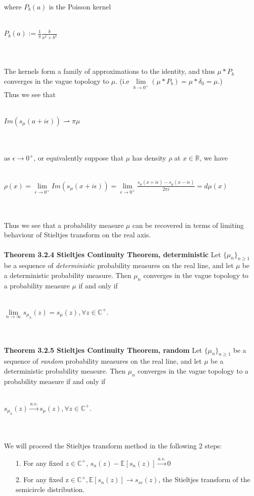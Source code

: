 \documentclass{article}
\begin{document}
where $P_b(a)$ is the Poisson kernel \\
\\
\centerline{$P_b(a) := \frac{1}{\pi} \frac{b}{x^2 + b^2}$}
\\
\\
The kernels form a family of approximations to the identity, and thus $\mu * P_b$ converges in the vague topology to $\mu$. (i.e $\lim\limits_{b \rightarrow 0^+} (\mu * P_b) = \mu * \delta_0 = \mu$.)\\
Thus we see that \\
\\
\centerline{$Im(s_\mu (a + i\epsilon)) \rightharpoonup \pi \mu$}
\\
\\
as $\epsilon \rightarrow 0^+$, or equivalently suppose that $\mu$ has density $\rho$ at $x \in \mathbb{R}$, we have \\
\\
\centerline{$\rho (x) = \lim\limits_{\epsilon \rightarrow 0^+} Im(s_\mu (x + i \epsilon)) = \lim\limits_{\epsilon \rightarrow 0^+} \frac{s_\mu (x + i\epsilon) - s_\mu (x - i\epsilon)}{2\pi i} = d\mu(x)$}
\\
\\
Thus we see that a probability measure $\mu$ can be recovered in terms of limiting behaviour of Stieltjes transform on the real axis. \\
\\
\textbf{Theorem 3.2.4 Stieltjes Continuity Theorem, deterministic} Let $\{\mu_n\}_{n \geq 1}$ be a sequence of \textit{deterministic} probability measures on the real line, and let $\mu$ be a deterministic probability measure. Then $\mu_n$ converges in the vague topology to a probability measure $\mu$ if and only if \\
\\
\centerline{$\lim\limits_{n \rightarrow \infty} s_{\mu_n}(z) = s_{\mu}(z), \forall z \in \mathbb{C}^+$.}
\\
\\
\textbf{Theorem 3.2.5 Stieltjes Continuity Theorem, random} Let $\{\mu_n\}_{n \geq 1}$ be a sequence of \textit{random} probability measures on the real line, and let $\mu$ be a deterministic probability measure. Then $\mu_n$ converges in the vague topology to a probability measure if and only if \\
\\
\centerline{$ s_{\mu_n}(z) \stackrel{a.s.}{\longrightarrow} s_{\mu}(z), \forall z \in \mathbb{C}^+$.}
\\
\\
We will proceed the Stieltjes transform method in the following 2 steps:
\begin{itemize}
    \item[1.] For any fixed $z \in \mathbb{C}^+$, $s_n(z) - \mathbb{E}[s_n(z)] \stackrel{a.s.}{\longrightarrow} 0$
    \item[2.] For any fixed z$\in \mathbb{C}^+, \mathbb{E}[s_n(z)] \rightarrow s_{sc}(z)$, the Stieltjes transform of the semicircle distribution.
\end{itemize}
\end{document}
